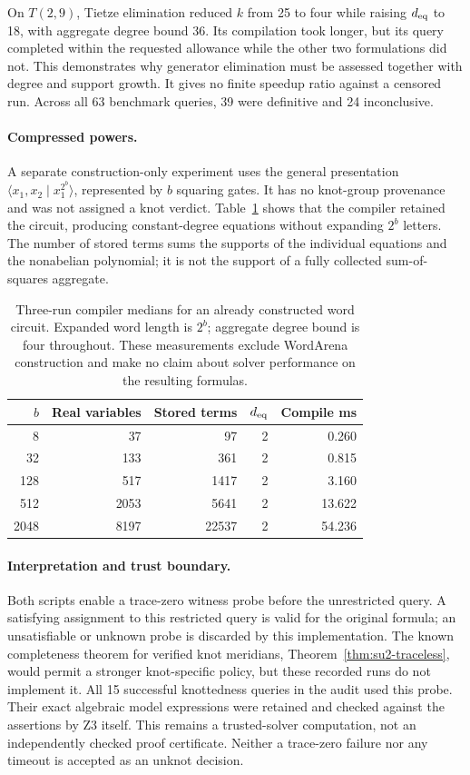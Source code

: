 On $T(2,9)$, Tietze elimination reduced $k$ from 25 to four while
raising $d_{\rm eq}$ to 18, with aggregate degree bound 36.
Its compilation took longer, but its query completed within the requested
allowance while the other two formulations did not.  This demonstrates
why generator elimination must be assessed together with degree and
support growth.  It gives no finite speedup ratio against a censored run.
Across all 63 benchmark queries, 39 were definitive and 24 inconclusive.

\paragraph{Compressed powers.}
A separate construction-only experiment uses the general presentation
$\langle x_1,x_2\mid x_1^{2^b}\rangle$, represented by $b$ squaring
gates.  It has no knot-group provenance and was not assigned a knot
verdict.  Table~\ref{tab:su2-recorded-powers} shows that the compiler
retained the circuit, producing constant-degree equations without
expanding $2^b$ letters.  The number of stored terms sums the supports
of the individual equations and the nonabelian polynomial; it is not the
support of a fully collected sum-of-squares aggregate.

\begin{table}[htbp]
\centering
\small
\begin{tabular}{rrrrr}
\hline
$b$ & Real variables & Stored terms & $d_{\rm eq}$ & Compile ms\\
\hline
8 & 37 & 97 & 2 & 0.260\\
32 & 133 & 361 & 2 & 0.815\\
128 & 517 & 1417 & 2 & 3.160\\
512 & 2053 & 5641 & 2 & 13.622\\
2048 & 8197 & 22537 & 2 & 54.236\\
\hline
\end{tabular}
\caption{Three-run compiler medians for an already constructed word
circuit.  Expanded word length is $2^b$; aggregate degree bound is four
throughout.  These measurements exclude WordArena construction and make
no claim about solver performance on the resulting formulas.}
\label{tab:su2-recorded-powers}
\end{table}

\paragraph{Interpretation and trust boundary.}
Both scripts enable a trace-zero witness probe before the unrestricted
query. A satisfying assignment to this restricted query is valid for
the original formula; an unsatisfiable or unknown probe is discarded by
this implementation. The known completeness theorem for verified knot
meridians, Theorem~\ref{thm:su2-traceless}, would permit a stronger
knot-specific policy, but these recorded runs do not implement it.
All 15 successful knottedness queries in the audit used this probe.
Their exact algebraic model expressions were retained and checked against
the assertions by Z3 itself.  This remains a trusted-solver computation,
not an independently checked proof certificate.  Neither a trace-zero
failure nor any timeout is accepted as an unknot decision.

